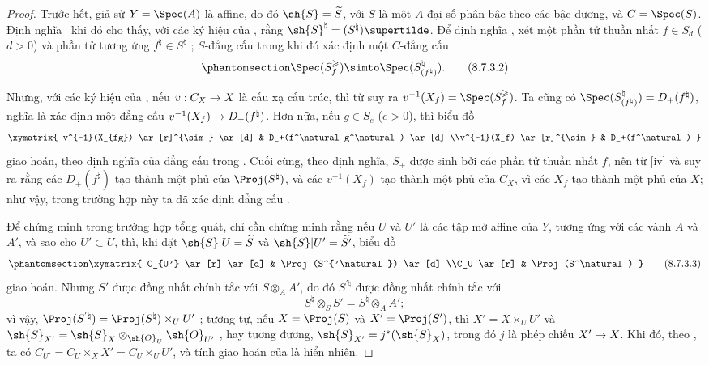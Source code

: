 \documentclass[oneside,10pt]{amsart}
\makeatletter
\renewcommand{\geq}{\geqslant}
\newcommand{\ega@arrow}[2]{\mathchoice{#1}{#2}{#2}{#2}}
\renewcommand{\to}{\ega@arrow{\longrightarrow}{\rightarrow}}
\newcommand{\oldpage}[2][]{\marginnote{\normalfont\footnotesize\textbf{#1}~|~#2}\ignorespaces}
\let\EGAOriginalLabel\label
\renewcommand{\label}[1]{\phantomsection\EGAOriginalLabel{#1}}
\makeatother
\begin{document}
\begin{proof}
Trước hết, giả sử $Y=\Spec(A)$ là affine, do đó $\sh{S}=\widetilde{S}$, với $S$ là một $A$-đại số phân bậc theo các bậc dương, và $C=\Spec(S)$.
Định nghĩa~ khi đó cho thấy, với các ký hiệu của , rằng $\sh{S}^\natural=(S^\natural)\supertilde$.
Để định nghĩa , xét một phần tử thuần nhất $f\in S_d$ ($d>0$) và phần tử tương ứng $f^\natural\in S^\natural$ ;
$S$-đẳng cấu trong  khi đó xác định một $C$-đẳng cấu
\[
\label{II.8.7.3.2}
  \Spec(S_f^\geq) \simto \Spec(S_{(f^\natural)}^\natural).
\tag{8.7.3.2}
\]

\oldpage[II]{175}
Nhưng, với các ký hiệu của , nếu $v:C_X\to X$ là cấu xạ cấu trúc, thì từ  suy ra $v^{-1}(X_f)=\Spec(S_f^\geq)$.
Ta cũng có $\Spec(S_{(f^\natural)}^\natural)=D_+(f^\natural)$, nghĩa là  xác định một đẳng cấu $v^{-1}(X_f)\to D_+(f^\natural)$.
Hơn nữa, nếu $g\in S_e$ ($e>0$), thì biểu đồ
\[
  \xymatrix{
    v^{-1}(X_{fg})
      \ar[r]^{\sim}
      \ar[d]
  & D_+(f^\natural g^\natural)
      \ar[d]
  \\v^{-1}(X_f)
      \ar[r]^{\sim}
  & D_+(f^\natural)
  }
\]
giao hoán, theo định nghĩa của đẳng cấu trong .
Cuối cùng, theo định nghĩa, $S_+$ được sinh bởi các phần tử thuần nhất $f$, nên từ [iv] và  suy ra rằng các $D_+(f^\natural)$ tạo thành một phủ của $\Proj(S^\natural)$, và các $v^{-1}(X_f)$ tạo thành một phủ của $C_X$, vì các $X_f$ tạo thành một phủ của $X$;
như vậy, trong trường hợp này ta đã xác định đẳng cấu .

Để chứng minh  trong trường hợp tổng quát, chỉ cần chứng minh rằng nếu $U$ và $U'$ là các tập mở affine của $Y$, tương ứng với các vành $A$ và $A'$, và sao cho $U'\subset U$, thì, khi đặt $\sh{S}|U=\widetilde{S}$ và $\sh{S}|U'=\widetilde{S'}$, biểu đồ
\[
\label{II.8.7.3.3}
  \xymatrix{
    C_{U'}
      \ar[r]
      \ar[d]
  & \Proj(S^{'\natural})
      \ar[d]
  \\C_U
      \ar[r]
  & \Proj(S^\natural)
  }
\tag{8.7.3.3}
\]
giao hoán.
Nhưng $S'$ được đồng nhất chính tắc với $S\otimes_A A'$, do đó $S^{'\natural}$ được đồng nhất chính tắc với
\[
  S^\natural \otimes_S S' = S^\natural \otimes_A A';
\]
vì vậy, $\Proj(S^{'\natural}) = \Proj(S^\natural)\times_U U'$ ;
tương tự, nếu $X=\Proj(S)$ và $X'=\Proj(S')$, thì $X'=X\times_U U'$ và $\sh{S}_{X'}=\sh{S}_X\otimes_{\sh{O}_U}\sh{O}_{U'}$ , hay tương đương, $\sh{S}_{X'}=j^*(\sh{S}_X)$, trong đó $j$ là phép chiếu $X'\to X$.
Khi đó, theo , ta có $C_{U'} = C_U\times_X X' = C_U\times_U U'$, và tính giao hoán của  là hiển nhiên.
\end{proof}
\end{document}
